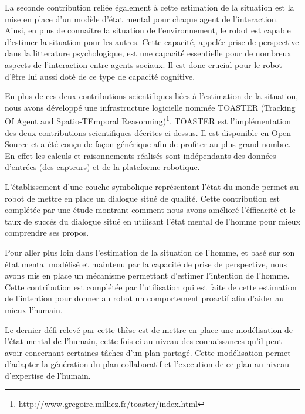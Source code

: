 \documentclass[a4paper,11pt,twoside]{StyleThese}
\begin{document}
La seconde contribution reliée également à cette estimation de la situation est la mise en place d'un modèle d'état mental pour chaque agent de l'interaction. Ainsi, en plus de connaître la situation de l'environnement, le robot est capable d'estimer la situation pour les autres. Cette capacité, appelée prise de perspective dans la litterature psychologique, est une capacité essentielle pour de nombreux aspects de l'interaction entre agents sociaux. Il est donc crucial pour le robot d'être lui aussi doté de ce type de capacité cognitive.

En plus de ces deux contributions scientifiques liées à l'estimation de la situation, nous avons développé une infrastructure logicielle nommée TOASTER (Tracking Of Agent and Spatio-TEmporal Reasonning)\footnote{http://www.gregoire.milliez.fr/toaster/index.html}. TOASTER est l'implémentation des deux contributions scientifiques décrites ci-dessus. Il est disponible en Open-Source et a été conçu de façon générique afin de profiter au plus grand nombre. En effet les calculs et raisonnements réalisés sont indépendants des données d'entrées (des capteurs) et de la plateforme robotique.

L'établissement d'une couche symbolique représentant l'état du monde permet au robot de mettre en place un dialogue situé de qualité. Cette contribution est complétée par une étude montrant comment nous avons amélioré l'éfficacité et le taux de succés du dialogue situé en utilisant l'état mental de l'homme pour mieux comprendre ses propos.


Pour aller plus loin dans l'estimation de la situation de l'homme, et basé sur son état mental modélisé et maintenu par la capacité de prise de perspective, nous avons mis en place un mécanisme permettant d'estimer l'intention de l'homme. Cette contribution est complétée par l'utilisation qui est faite de cette estimation de l'intention pour donner au robot un comportement proactif afin d'aider au mieux l'humain. 

Le dernier défi relevé par cette thèse est de mettre en place une modélisation de l'état mental de l'humain, cette fois-ci au niveau des connaissances qu'il peut avoir concernant certaines tâches d'un plan partagé. Cette modélisation permet d'adapter la génération du plan collaboratif et l'execution de ce plan au niveau d'expertise de l'humain.

\end{document}
